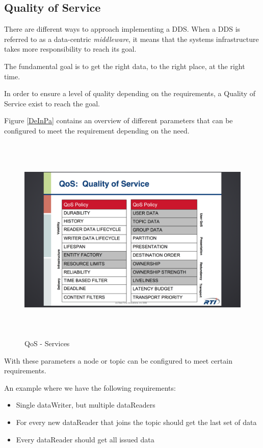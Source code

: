 \subsection{Quality of Service}

There are different ways to approach implementing a DDS. When a DDS is referred to as a data-centric \emph{middleware}, it means that the systems infrastructure takes more responsibility to reach its goal.

The fundamental goal is to get the right data, to the right place, at the right time.

In order to ensure a level of quality depending on the requirements, a Quality of Service exist to reach the goal.

Figure \ref{DeInPa} contains an overview of different parameters that can be configured to meet the requirement depending on the need.

\begin{figure}[h]
\centering
\includegraphics[height=100mm, keepaspectratio]{img/dds_question_4-6/QoS_services}
\caption{QoS - Services}
\label{QoS - Services}
\end{figure}

\newpage

With these parameters a node or topic can be configured to meet certain requirements.

An example where we have the following requirements:

\begin{itemize}
\item Single dataWriter, but multiple dataReaders
\item For every new dataReader that joins the topic should get the last set of data
\item Every dataReader should get all issued data
\end{itemize}

